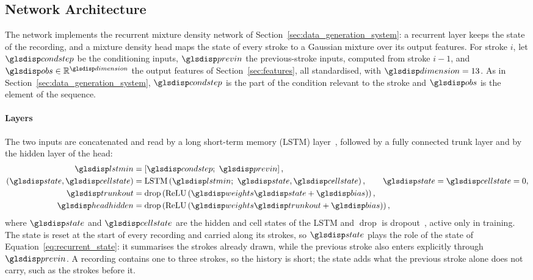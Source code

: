 \documentclass[12pt]{report}
\begin{document}
\subsection{Network Architecture}
\label{sec:network_architecture}
The network implements the recurrent mixture density network of Section~\ref{sec:data_generation_system}: a recurrent layer keeps the state of the recording, and a mixture density head maps the state of every stroke to a Gaussian mixture over its output features. For stroke $i$, let $\sym{condstep}_i$ be the conditioning inputs, $\sym{previn}_{i-1}$ the previous-stroke inputs, computed from stroke $i-1$, and $\sym{obs}_i\in\mathbb R^{\sym{dimension}}$ the output features of Section~\ref{sec:features}, all standardised, with $\sym{dimension}=13$. As in Section~\ref{sec:data_generation_system}, $\sym{condstep}_i$ is the part of the condition relevant to the stroke and $\sym{obs}_i$ is the element of the sequence.

\paragraph{Layers}
The two inputs are concatenated and read by a long short-term memory (LSTM) layer~\cite{hochreiter1997long}, followed by a fully connected trunk layer and by the hidden layer of the head:
\begin{equation}
    \begin{aligned}
        \sym{lstmin}_i &= \left[\sym{condstep}_i;\ \sym{previn}_{i-1}\right],\\
        \left(\sym{state}_i, \sym{cellstate}_i\right) &= \operatorname{LSTM}\left(\sym{lstmin}_i;\ \sym{state}_{i-1}, \sym{cellstate}_{i-1}\right),
            \qquad \sym{state}_{-1}=\sym{cellstate}_{-1}=0,\\
        \sym{trunkout}_i &= \operatorname{drop}\left(\operatorname{ReLU}\left(\sym{weights}_g \sym{state}_i+\sym{bias}_g\right)\right),\\
        \sym{headhidden}_i &= \operatorname{drop}\left(\operatorname{ReLU}\left(\sym{weights}_a \sym{trunkout}_i+\sym{bias}_a\right)\right),
    \end{aligned}
    \label{eq:network_layers}
\end{equation}
where $\sym{state}_i$ and $\sym{cellstate}_i$ are the hidden and cell states of the LSTM and $\operatorname{drop}$ is dropout~\cite{srivastava2014dropout}, active only in training. The state is reset at the start of every recording and carried along its strokes, so $\sym{state}_i$ plays the role of the state of Equation~\eqref{eq:recurrent_state}: it summarises the strokes already drawn, while the previous stroke also enters explicitly through $\sym{previn}_{i-1}$. A recording contains one to three strokes, so the history is short; the state adds what the previous stroke alone does not carry, such as the strokes before it.
\end{document}
